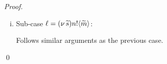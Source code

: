 \begin{proof}
\begin{enumerate}
\begin{enumerate}[i.]
				\item	Sub-case $\ell = (\nu\, \widetilde{s}) n ! \langle \widetilde{m} \rangle$:

						\noi Follows similar arguments as the previous case.
			\end{enumerate}
\end{enumerate}
	\qed
\end{proof}


%



